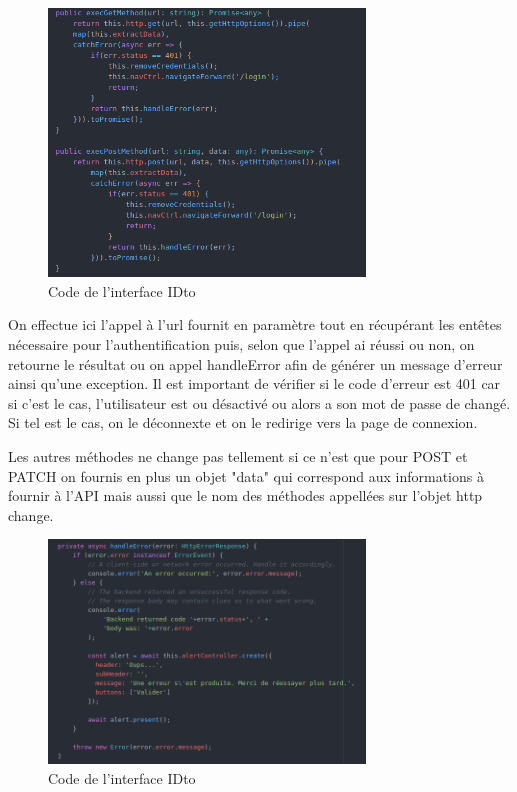 				\begin{figure}[H]
					\centering\includegraphics[width=0.75\textwidth, keepaspectratio]{res/ionic-rest-execmethod.png}
					\caption{Code de l'interface IDto}
				\end{figure}

				On effectue ici l'appel à l'url fournit en paramètre tout en récupérant les entêtes nécessaire pour l'authentification puis, selon que l'appel ai réussi ou non, on retourne le résultat ou on appel handleError afin de générer un message d'erreur ainsi qu'une exception. Il est important de vérifier si le code d'erreur est 401 car si c'est le cas, l'utilisateur est ou désactivé ou alors a son mot de passe de changé. Si tel est le cas, on le déconnexte et on le redirige vers la page de connexion.

				Les autres méthodes ne change pas tellement si ce n'est que pour POST et PATCH on fournis en plus un objet "data" qui correspond aux informations à fournir à l'API mais aussi que le nom des méthodes appellées sur l'objet http change.

				\begin{figure}[H]
					\centering\includegraphics[width=0.75\textwidth, keepaspectratio]{res/ionic-rest-error.png}
					\caption{Code de l'interface IDto}
				\end{figure}

